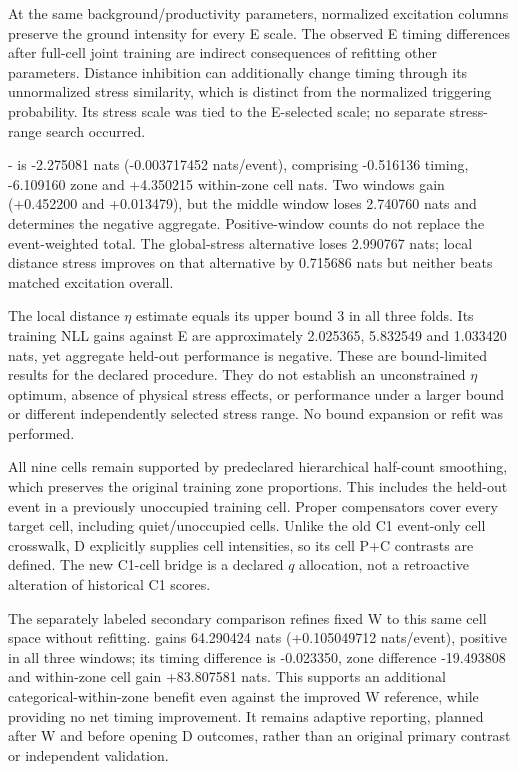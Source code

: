 At the same background/productivity parameters, normalized excitation columns preserve the ground intensity for every E scale. The observed E timing differences after full-cell joint training are indirect consequences of refitting other parameters. Distance inhibition can additionally change timing through its unnormalized stress similarity, which is distinct from the normalized triggering probability. Its stress scale was tied to the E-selected scale; no separate stress-range search occurred.

\allowbreak{}-\allowbreak{} is -2.275081 nats (-0.003717452 nats/event), comprising -0.516136 timing, -6.109160 zone and +4.350215 within-zone cell nats. Two windows gain (+0.452200 and +0.013479), but the middle window loses 2.740760 nats and determines the negative aggregate. Positive-window counts do not replace the event-weighted total. The global-stress alternative loses 2.990767 nats; local distance stress improves on that alternative by 0.715686 nats but neither beats matched excitation overall.

The local distance $\eta$ estimate equals its upper bound 3 in all three folds. Its training NLL gains against E are approximately 2.025365, 5.832549 and 1.033420 nats, yet aggregate held-out performance is negative. These are bound-limited results for the declared procedure. They do not establish an unconstrained $\eta$ optimum, absence of physical stress effects, or performance under a larger bound or different independently selected stress range. No bound expansion or refit was performed.

All nine cells remain supported by predeclared hierarchical half-count smoothing, which preserves the original training zone proportions. This includes the held-out event in a previously unoccupied training cell. Proper compensators cover every target cell, including quiet/unoccupied cells. Unlike the old C1 event-only cell crosswalk, D explicitly supplies cell intensities, so its cell P+C contrasts are defined. The new C1-cell bridge is a declared $q$ allocation, not a retroactive alteration of historical C1 scores.

The separately labeled secondary comparison refines fixed W  to this same cell space without refitting.  gains 64.290424 nats (+0.105049712 nats/event), positive in all three windows; its timing difference is -0.023350, zone difference -19.493808 and within-zone cell gain +83.807581 nats. This supports an additional categorical-within-zone benefit even against the improved W reference, while providing no net timing improvement. It remains adaptive reporting, planned after W and before opening D outcomes, rather than an original primary contrast or independent validation.

